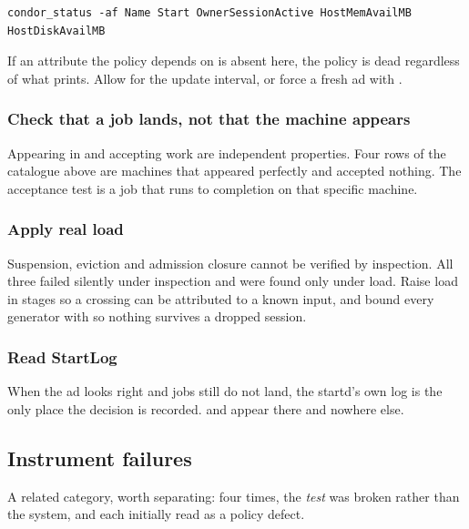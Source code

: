 \begin{lstlisting}[style=term]
condor_status -af Name Start OwnerSessionActive HostMemAvailMB HostDiskAvailMB
\end{lstlisting}

If an attribute the policy depends on is absent here, the policy is dead
regardless of what  prints. Allow for the update
interval, or force a fresh ad with .

\subsubsection{Check that a job lands, not that the machine appears}

Appearing in  and accepting work are independent properties.
Four rows of the catalogue above are machines that appeared perfectly and
accepted nothing. The acceptance test is a job that runs to completion on that
specific machine.

\subsubsection{Apply real load}

Suspension, eviction and admission closure cannot be verified by inspection.
All three failed silently under inspection and were found only under load. Raise
load in stages so a crossing can be attributed to a known input, and bound every
generator with  so nothing survives a dropped session.

\subsubsection{Read StartLog}

When the ad looks right and jobs still do not land, the startd's own log is the
only place the decision is recorded.  and
 appear there and nowhere else.

\subsection{Instrument failures}
\label{sec:instruments}

A related category, worth separating: four times, the \emph{test} was broken
rather than the system, and each initially read as a policy defect.

